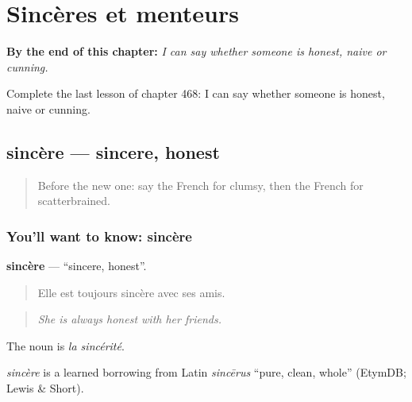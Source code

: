 
\chapter{Sincères et menteurs}
\label{ch:fr-sinceres-et-menteurs}

\begin{chapteropening}
\textbf{By the end of this chapter:} \emph{I can say whether someone is honest, naive or cunning.}

Complete the last lesson of chapter 468: I can say whether someone is honest, naive or cunning.
\end{chapteropening}

\section[sincère]{sincère — sincere, honest}

\label{lesson:FR-C468-sincere}



\begin{quote}
Before the new one: say the French for clumsy, then the French for scatterbrained.
\end{quote}

\subsection*{You'll want to know: sincère}
\textbf{sincère} — \textquotedblleft{}sincere, honest\textquotedblright{}.

\begin{quote}
Elle est toujours sincère avec ses amis.
\end{quote}

\begin{quote}
\emph{She is always honest with her friends.}
\end{quote}

The noun is \emph{la sincérité}.

\begin{cousinweb}
\emph{sincère} is a learned borrowing from Latin \emph{sincērus} \textquotedblleft{}pure, clean, whole\textquotedblright{} (EtymDB; Lewis \& Short).
\end{cousinweb}


